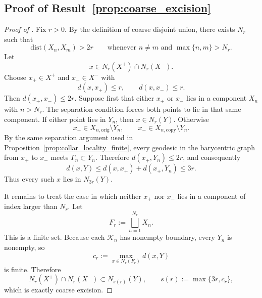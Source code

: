 \documentclass[11pt]{article}
\numberwithin{equation}{section}
\theoremstyle{definition}
\theoremstyle{remark}
\newcommand{\K}{\mathcal{K}}
\newcommand{\dist}{\mathrm{dist}}
\begin{document}
\subsection{Proof of Result~\ref{prop:coarse_excision}}\label{app:proof:prop:coarse_excision}
\begin{proof}[Proof of ]
Fix $r>0$. By the definition of coarse disjoint union, there exists $N_r$ such that
\[
\dist(X_n,X_m)>2r
\qquad\text{whenever }n\neq m\text{ and }\max\{n,m\}>N_r.
\]
Let
\[
x\in N_r(X^+)\cap N_r(X^-).
\]
Choose $x_+\in X^+$ and $x_-\in X^-$ with
\[
d(x,x_+)\le r,
\qquad
d(x,x_-)\le r.
\]
Then $d(x_+,x_-)\le2r$. Suppose first that either $x_+$ or $x_-$ lies in a component $X_n$ with
$n>N_r$. The separation condition forces both points to lie in that same component. If either
point lies in $Y_n$, then $x\in N_r(Y)$. Otherwise
\[
x_+\in X_{n,\mathrm{orig}}\setminus Y_n,
\qquad
x_-\in X_{n,\mathrm{copy}}\setminus Y_n.
\]
By the same separation argument used in Proposition~\ref{prop:collar_locality_finite}, every
geodesic in the barycentric graph from $x_+$ to $x_-$ meets $\Gamma_n\subset Y_n$. Therefore
$d(x_+,Y_n)\le 2r$, and consequently
\[
d(x,Y)\le d(x,x_+)+d(x_+,Y_n)\le 3r.
\]
Thus every such $x$ lies in $N_{3r}(Y)$.

It remains to treat the case in which neither $x_+$ nor $x_-$ lies in a component of index
larger than $N_r$. Let
\[
F_r:=\bigsqcup_{n=1}^{N_r} X_n.
\]
This is a finite set. Because each $\K_n$ has nonempty boundary, every $Y_n$ is nonempty, so
\[
c_r:=\max_{x\in N_r(F_r)} d(x,Y)
\]
is finite. Therefore
\[
N_r(X^+)\cap N_r(X^-)\subset N_{s(r)}(Y),
\qquad
s(r):=\max\{3r,c_r\},
\]
which is exactly coarse excision.
\end{proof}
\end{document}
